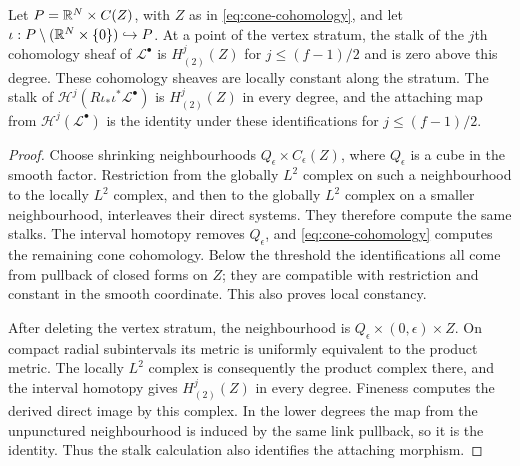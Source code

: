 \begin{lemma}\label{lem:local-intersection}
Let $P=\mathbb R^N\times C(Z)$, with $Z$ as in
\eqref{eq:cone-cohomology}, and let
$\iota:P\setminus(\mathbb R^N\times\{0\})\hookrightarrow P$.
At a point of the vertex stratum, the stalk of the $j$th
cohomology sheaf of $\mathcal L^\bullet$ is $H^j_{(2)}(Z)$
for $j\le(f-1)/2$ and is zero above this degree. These
cohomology sheaves are locally constant along the stratum.
The stalk of $\mathcal H^j(R\iota_*\iota^*\mathcal L^\bullet)$
is $H^j_{(2)}(Z)$ in every degree, and the attaching map from
$\mathcal H^j(\mathcal L^\bullet)$ is the identity under these
identifications for $j\le(f-1)/2$.
\end{lemma}
\begin{proof}
Choose shrinking neighbourhoods $Q_\epsilon\times C_\epsilon(Z)$,
where $Q_\epsilon$ is a cube in the smooth factor. Restriction
from the globally $L^2$ complex on such a neighbourhood to the
locally $L^2$ complex, and then to the globally $L^2$ complex
on a smaller neighbourhood, interleaves their direct systems.
They therefore compute the same stalks. The interval homotopy
removes $Q_\epsilon$, and \eqref{eq:cone-cohomology} computes
the remaining cone cohomology. Below the threshold the
identifications all come from pullback of closed forms on $Z$;
they are compatible with restriction and constant in the smooth
coordinate. This also proves local constancy.

After deleting the vertex stratum, the neighbourhood is
$Q_\epsilon\times(0,\epsilon)\times Z$. On compact radial
subintervals its metric is uniformly equivalent to the product
metric. The locally $L^2$ complex is consequently the product
complex there, and the interval homotopy gives $H^j_{(2)}(Z)$
in every degree. Fineness computes the derived direct image by
this complex. In the lower degrees the map from the unpunctured
neighbourhood is induced by the same link pullback, so it is the
identity. Thus the stalk calculation also identifies the
attaching morphism.
\end{proof}

